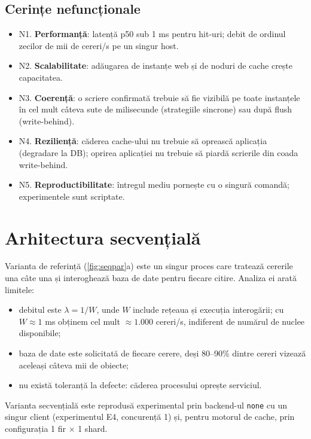 \subsection{Cerințe nefuncționale}
\begin{itemize}
  \item N1. \textbf{Performanță}: latență p50 sub 1 ms pentru hit-uri; debit de ordinul zecilor de mii de
        cereri/s pe un singur host.
  \item N2. \textbf{Scalabilitate}: adăugarea de instanțe web și de noduri de cache crește capacitatea.
  \item N3. \textbf{Coerență}: o scriere confirmată trebuie să fie vizibilă pe toate instanțele în cel mult
        câteva sute de milisecunde (strategiile sincrone) sau după flush (write-behind).
  \item N4. \textbf{Reziliență}: căderea cache-ului nu trebuie să oprească aplicația (degradare la DB);
        oprirea aplicației nu trebuie să piardă scrierile din coada write-behind.
  \item N5. \textbf{Reproductibilitate}: întregul mediu pornește cu o singură comandă; experimentele sunt
        scriptate.
\end{itemize}

\section{Arhitectura secvențială}
\label{sec:secvential}

Varianta de referință (\cref{fig:seqpar}a) este un singur proces care tratează cererile una câte una și
interoghează baza de date pentru fiecare citire. Analiza ei arată limitele:

\begin{itemize}
  \item debitul este $\lambda = 1/W$, unde $W$ include rețeaua și execuția interogării; cu $W \approx 1$ ms
        obținem cel mult $\approx 1.000$ cereri/s, indiferent de numărul de nuclee disponibile;
  \item baza de date este solicitată de fiecare cerere, deși 80–90\% dintre cereri vizează aceleași câteva
        mii de obiecte;
  \item nu există toleranță la defecte: căderea procesului oprește serviciul.
\end{itemize}

Varianta secvențială este reprodusă experimental prin backend-ul \texttt{none} cu un singur client
(experimentul E4, concurență 1) și, pentru motorul de cache, prin configurația 1 fir × 1 shard.

